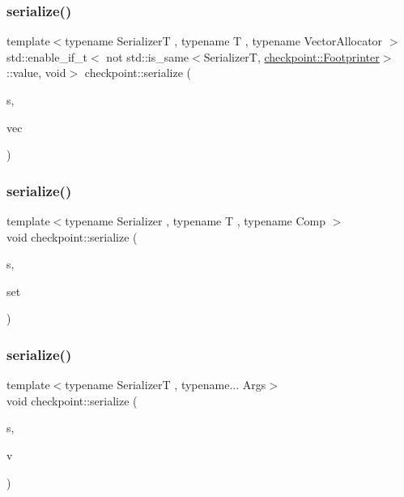 \mbox{\label{namespacecheckpoint_ae9a809c203a65d06dbd99acc82be4844}} 
\subsubsection{\texorpdfstring{serialize()}{serialize()}\hspace{0.1cm}{\footnotesize\ttfamily [19/30]}}
{\footnotesize\ttfamily template$<$typename SerializerT , typename T , typename Vector\+Allocator $>$ \\
std\+::enable\+\_\+if\+\_\+t$<$ not std\+::is\+\_\+same$<$SerializerT, \hyperlink{structcheckpoint_1_1_footprinter}{checkpoint\+::\+Footprinter}$>$\+::value, void$>$ checkpoint\+::serialize (\begin{DoxyParamCaption}\item[{SerializerT \&}]{s,  }\item[{std\+::vector$<$ T, Vector\+Allocator $>$ \&}]{vec }\end{DoxyParamCaption})}

\mbox{\label{namespacecheckpoint_ae032265314cdf8e9155a6bbc423ca1c9}} 
\subsubsection{\texorpdfstring{serialize()}{serialize()}\hspace{0.1cm}{\footnotesize\ttfamily [20/30]}}
{\footnotesize\ttfamily template$<$typename Serializer , typename T , typename Comp $>$ \\
void checkpoint\+::serialize (\begin{DoxyParamCaption}\item[{Serializer \&}]{s,  }\item[{std\+::multiset$<$ T, Comp $>$ \&}]{set }\end{DoxyParamCaption})\hspace{0.3cm}{\ttfamily [inline]}}

\mbox{\label{namespacecheckpoint_a8814df20276406605912524fad29c49b}} 
\subsubsection{\texorpdfstring{serialize()}{serialize()}\hspace{0.1cm}{\footnotesize\ttfamily [21/30]}}
{\footnotesize\ttfamily template$<$typename SerializerT , typename... Args$>$ \\
void checkpoint\+::serialize (\begin{DoxyParamCaption}\item[{SerializerT \&}]{s,  }\item[{std\+::variant$<$ Args... $>$ \&}]{v }\end{DoxyParamCaption})}

